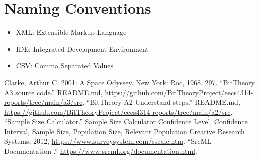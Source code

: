 \documentclass[12pt, dvipsnames, a4paper]{article}
\begin{document}
\section{Naming Conventions}
\begin{itemize}
	\item {XML: Extensible Markup Language}
	\item {IDE: Integrated Development Environment}
	\item {CSV: Comma Separated Values}
\end{itemize}

\begin{thebibliography}{00}
	 Clarke, Arthur C. 2001: A Space Odyssey. New York: Roc, 1968. 297.
	 “BitTheory A3 source code.” README.md, \href{https://github.com/BitTheoryProject/eecs4314-reports/tree/main/a3/src}{https://github.com/BitTheoryProject/eecs4314-reports/tree/main/a3/src}.
	 “BitTheory A2 Understand steps.” README.md, \href{https://github.com/BitTheoryProject/eecs4314-reports/tree/main/a2/src}{https://github.com/BitTheoryProject/eecs4314-reports/tree/main/a2/src}.
	 “Sample Size Calculator.” Sample Size Calculator \- Confidence Level, Confidence Interval, Sample Size, Population Size, Relevant Population \- Creative Research Systems, 2012, \href{https://www.surveysystem.com/sscalc.htm}{https://www.surveysystem.com/sscalc.htm}.
	 “SrcML Documentation .” \href{https://www.srcml.org/documentation.html}{https://www.srcml.org/documentation.html}.
\end{thebibliography}
\end{document}
